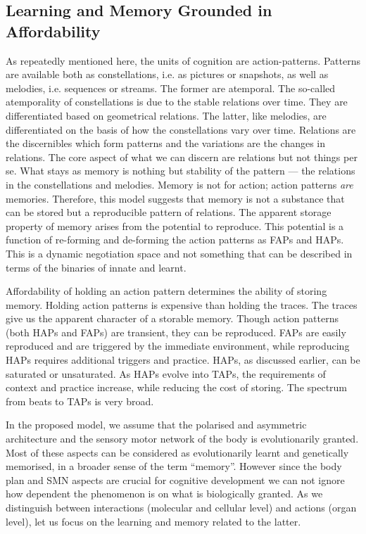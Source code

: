 \subsection{Learning and Memory Grounded in Affordability}
As repeatedly mentioned here, the units of cognition are action-patterns. Patterns are available both as constellations, i.e. as pictures or snapshots, as well as melodies, i.e. sequences or streams. The former are atemporal. The so-called atemporality of constellations is due to the stable relations over time. They are differentiated based on geometrical relations. The latter, like melodies, are differentiated on the basis of how the constellations vary over time. Relations are the discernibles which form patterns and the variations are the changes in relations. The core aspect of what we can discern are relations but not things per se. What stays as memory is nothing but stability of the pattern --- the relations in the constellations and melodies. Memory is not for action; action patterns \textit{are} memories. Therefore, this model suggests that memory is not a substance that can be stored but a reproducible pattern of relations. The apparent storage property of memory arises from the potential to reproduce.
This potential is a function of re-forming and de-forming the action patterns as FAPs and HAPs. This is a dynamic negotiation space and not something that can be described in terms of the binaries of innate and learnt. 

Affordability of holding an action pattern determines the ability of storing memory. Holding action patterns is expensive than holding the traces. The traces give us the apparent character of a storable memory. Though action patterns (both HAPs and FAPs) are transient, they can be reproduced. FAPs are easily reproduced and are triggered by the immediate environment, while reproducing HAPs requires additional triggers and practice. HAPs, as discussed earlier, can be saturated or unsaturated. As HAPs evolve into TAPs, the requirements of context and practice increase, while reducing the cost of storing. The spectrum from beats to TAPs is very broad. 

In the proposed model, we assume that the polarised and asymmetric architecture and the sensory motor network of the body is evolutionarily granted. Most of these aspects can be considered as evolutionarily learnt and genetically memorised, in a broader sense of the term ``memory''. However since the body plan and SMN aspects are crucial for cognitive development we can not ignore how dependent the phenomenon is on what is biologically granted. As we distinguish between interactions (molecular and cellular level) and actions (organ level), let us focus on the learning and memory related to the latter. 

